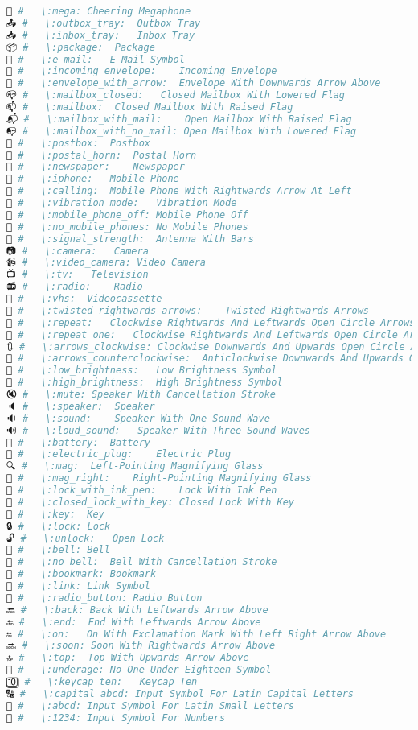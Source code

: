\begin{lstlisting}[language=Julia, style=julia]
📣 #   \:mega: Cheering Megaphone
📤 #   \:outbox_tray:  Outbox Tray
📥 #   \:inbox_tray:   Inbox Tray
📦 #   \:package:  Package
📧 #   \:e-mail:   E-Mail Symbol
📨 #   \:incoming_envelope:    Incoming Envelope
📩 #   \:envelope_with_arrow:  Envelope With Downwards Arrow Above
📪 #   \:mailbox_closed:   Closed Mailbox With Lowered Flag
📫 #   \:mailbox:  Closed Mailbox With Raised Flag
📬 #   \:mailbox_with_mail:    Open Mailbox With Raised Flag
📭 #   \:mailbox_with_no_mail: Open Mailbox With Lowered Flag
📮 #   \:postbox:  Postbox
📯 #   \:postal_horn:  Postal Horn
📰 #   \:newspaper:    Newspaper
📱 #   \:iphone:   Mobile Phone
📲 #   \:calling:  Mobile Phone With Rightwards Arrow At Left
📳 #   \:vibration_mode:   Vibration Mode
📴 #   \:mobile_phone_off: Mobile Phone Off
📵 #   \:no_mobile_phones: No Mobile Phones
📶 #   \:signal_strength:  Antenna With Bars
📷 #   \:camera:   Camera
📹 #   \:video_camera: Video Camera
📺 #   \:tv:   Television
📻 #   \:radio:    Radio
📼 #   \:vhs:  Videocassette
🔀 #   \:twisted_rightwards_arrows:    Twisted Rightwards Arrows
🔁 #   \:repeat:   Clockwise Rightwards And Leftwards Open Circle Arrows
🔂 #   \:repeat_one:   Clockwise Rightwards And Leftwards Open Circle Arrows, Circled One
🔃 #   \:arrows_clockwise: Clockwise Downwards And Upwards Open Circle Arrows
🔄 #   \:arrows_counterclockwise:  Anticlockwise Downwards And Upwards Open Circle Arrows
🔅 #   \:low_brightness:   Low Brightness Symbol
🔆 #   \:high_brightness:  High Brightness Symbol
🔇 #   \:mute: Speaker With Cancellation Stroke
🔈 #   \:speaker:  Speaker
🔉 #   \:sound:    Speaker With One Sound Wave
🔊 #   \:loud_sound:   Speaker With Three Sound Waves
🔋 #   \:battery:  Battery
🔌 #   \:electric_plug:    Electric Plug
🔍 #   \:mag:  Left-Pointing Magnifying Glass
🔎 #   \:mag_right:    Right-Pointing Magnifying Glass
🔏 #   \:lock_with_ink_pen:    Lock With Ink Pen
🔐 #   \:closed_lock_with_key: Closed Lock With Key
🔑 #   \:key:  Key
🔒 #   \:lock: Lock
🔓 #   \:unlock:   Open Lock
🔔 #   \:bell: Bell
🔕 #   \:no_bell:  Bell With Cancellation Stroke
🔖 #   \:bookmark: Bookmark
🔗 #   \:link: Link Symbol
🔘 #   \:radio_button: Radio Button
🔙 #   \:back: Back With Leftwards Arrow Above
🔚 #   \:end:  End With Leftwards Arrow Above
🔛 #   \:on:   On With Exclamation Mark With Left Right Arrow Above
🔜 #   \:soon: Soon With Rightwards Arrow Above
🔝 #   \:top:  Top With Upwards Arrow Above
🔞 #   \:underage: No One Under Eighteen Symbol
🔟 #   \:keycap_ten:   Keycap Ten
🔠 #   \:capital_abcd: Input Symbol For Latin Capital Letters
🔡 #   \:abcd: Input Symbol For Latin Small Letters
🔢 #   \:1234: Input Symbol For Numbers

\end{lstlisting}
